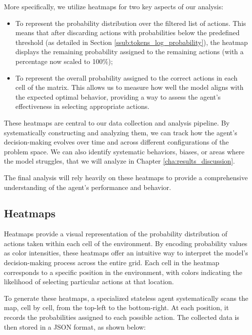 More specifically, we utilize heatmaps for two key aspects of our analysis:

\begin{itemize}
  \item To represent the probability distribution over the filtered list of actions.
    This means that after discarding actions with probabilities below the
    predefined threshold (as detailed in Section \ref{ssub:tokens_log_probability}),
    the heatmap displays the remaining probability assigned to the remaining actions
    (with a percentage now scaled to 100\%);

  \item To represent the overall probability assigned to the correct actions in each
    cell of the matrix. This allows us to measure how well the model aligns with
    the expected optimal behavior, providing a way to assess the agent's effectiveness
    in selecting appropriate actions.
\end{itemize}

These heatmaps are central to our data collection and analysis pipeline. By systematically
constructing and analyzing them, we can track how the agent's decision-making
evolves over time and across different configurations of the problem space. We can
also identify systematic behaviors, biases, or areas where the model struggles,
that we will analyze in Chapter \ref{cha:results_discussion}.

The final analysis will rely heavily on these heatmaps to provide a
comprehensive understanding of the agent's performance and behavior.

\subsection{Heatmaps}
\label{sub:heatmaps}

Heatmaps provide a visual representation of the probability distribution of actions
taken within each cell of the environment. By encoding probability values as
color intensities, these heatmaps offer an intuitive way to interpret the model's
decision-making process across the entire grid. Each cell in the heatmap
corresponds to a specific position in the environment, with colors indicating the
likelihood of selecting particular actions at that location.

To generate these heatmaps, a specialized stateless agent systematically scans
the map, cell by cell, from the top-left to the bottom-right. At each position,
it records the probabilities assigned to each possible action. The collected data
is then stored in a JSON format, as shown below:

